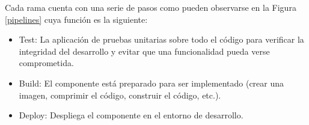 Cada rama cuenta con  una serie de pasos como pueden observarse en la Figura \ref{pipelines} cuya función es la siguiente:
\begin{itemize}
\item Test: La aplicación de pruebas unitarias sobre todo el código para verificar la integridad del desarrollo y evitar que una funcionalidad pueda verse comprometida.
\item Build: El componente está preparado para ser implementado (crear una imagen, comprimir el código, construir el código, etc.).
\item Deploy: Despliega el componente en el entorno de desarrollo.
\end{itemize}
